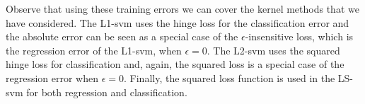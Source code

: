 Observe that using these training errors we can cover the kernel methods that we have considered. The L1-\acrshort{svm} uses the hinge loss for the classification error and the absolute error can be seen as a special case of the $\epsilon$-insensitive loss, which is the regression error of the L1-\acrshort{svm}, when $\epsilon = 0$. The L2-\acrshort{svm} uses the squared hinge loss for classification and, again, the squared loss is a special case of the regression error when $\epsilon=0$. Finally, the squared loss function is used in the LS-\acrshort{svm} for both regression and classification.

